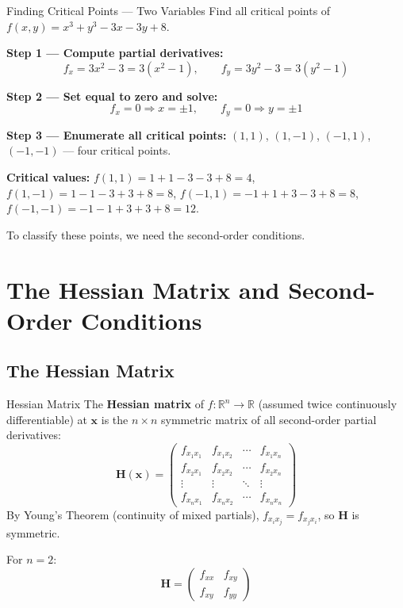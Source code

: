 \documentclass[12pt, a4paper]{article}
\theoremstyle{definition}
\newcommand{\R}{\mathbb{R}}
\newcommand{\bx}{\mathbf{x}}
\newcommand{\bH}{\mathbf{H}}
\begin{document}
\begin{exbox}{Finding Critical Points --- Two Variables}
Find all critical points of $f(x, y) = x^3 + y^3 - 3x - 3y + 8$.

\textbf{Step 1 --- Compute partial derivatives:}
\[
  f_x = 3x^2 - 3 = 3(x^2-1), \qquad f_y = 3y^2 - 3 = 3(y^2-1)
\]

\textbf{Step 2 --- Set equal to zero and solve:}
\[
  f_x = 0 \Rightarrow x = \pm 1, \qquad f_y = 0 \Rightarrow y = \pm 1
\]

\textbf{Step 3 --- Enumerate all critical points:}
$(1,1)$, $(1,-1)$, $(-1,1)$, $(-1,-1)$ --- four critical points.

\textbf{Critical values:}
$f(1,1) = 1+1-3-3+8 = 4$,\quad
$f(1,-1) = 1-1-3+3+8 = 8$,\quad
$f(-1,1) = -1+1+3-3+8 = 8$,\quad
$f(-1,-1) = -1-1+3+3+8 = 12$.

To classify these points, we need the second-order conditions.
\end{exbox}
\newpage
\section{The Hessian Matrix and Second-Order Conditions}

\subsection{The Hessian Matrix}

\begin{defbox}{Hessian Matrix}
The \textbf{Hessian matrix} of $f: \R^n \to \R$ (assumed twice
continuously differentiable) at $\bx$ is the $n \times n$ symmetric matrix
of all second-order partial derivatives:
\[
  \bH(\bx) = \begin{pmatrix}
    f_{x_1 x_1} & f_{x_1 x_2} & \cdots & f_{x_1 x_n} \\
    f_{x_2 x_1} & f_{x_2 x_2} & \cdots & f_{x_2 x_n} \\
    \vdots       & \vdots       & \ddots & \vdots \\
    f_{x_n x_1} & f_{x_n x_2} & \cdots & f_{x_n x_n}
  \end{pmatrix}
\]
By Young's Theorem (continuity of mixed partials),
$f_{x_i x_j} = f_{x_j x_i}$, so $\bH$ is symmetric.

For $n=2$:
\[
  \bH = \begin{pmatrix} f_{xx} & f_{xy} \\ f_{xy} & f_{yy} \end{pmatrix}
\]
\end{defbox}
\end{document}
